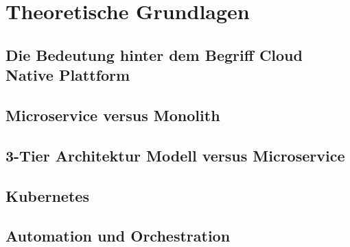 \newpage
\section{Theoretische Grundlagen}
\subsection{Die Bedeutung hinter dem Begriff Cloud Native Plattform}
\subsection{Microservice versus Monolith}
\subsection{3-Tier Architektur Modell versus Microservice}
\subsection{Kubernetes}
\subsection{Automation und Orchestration}